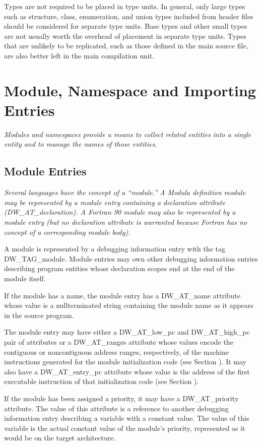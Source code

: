 Types are not required to be placed in type units. In general,
only large types such as structure, class, enumeration, and
union types included from header files should be considered
for separate type units. Base types and other small types
are not usually worth the overhead of placement in separate
type units. Types that are unlikely to be replicated, such
as those defined in the main source file, are also better
left in the main compilation unit.

\section{Module, Namespace and Importing Entries}
\textit{Modules and namespaces provide a means to collect related
entities into a single entity and to manage the names of
those entities.}

\subsection{Module Entries}
\label{chap:moduleentries}
\textit{Several languages have the concept of a ``module.''
A Modula definition module may be represented by a module
entry containing a declaration attribute (DW\_AT\_declaration). A
Fortran 90 module may also be represented by a module entry
(but no declaration attribute is warranted because Fortran
has no concept of a corresponding module body).}

A module is represented by a debugging information entry
with the tag DW\_TAG\_module.  Module entries may own other
debugging information entries describing program entities
whose declaration scopes end at the end of the module itself.

If the module has a name, the module entry has a DW\_AT\_name
attribute whose value is a null\dash terminated string containing
the module name as it appears in the source program.

The module entry may have either a DW\_AT\_low\_pc and
DW\_AT\_high\_pc pair of attributes or a DW\_AT\_ranges attribute
whose values encode the contiguous or non\dash contiguous address
ranges, respectively, of the machine instructions generated for
the module initialization code 
(see Section ). 
It may also
have a DW\_AT\_entry\_pc attribute whose value is the address of
the first executable instruction of that initialization code
(see Section ).

If the module has been assigned a priority, it may have a
DW\_AT\_priority attribute. The value of this attribute is a
reference to another debugging information entry describing
a variable with a constant value. The value of this variable
is the actual constant value of the module’s priority,
represented as it would be on the target architecture.

